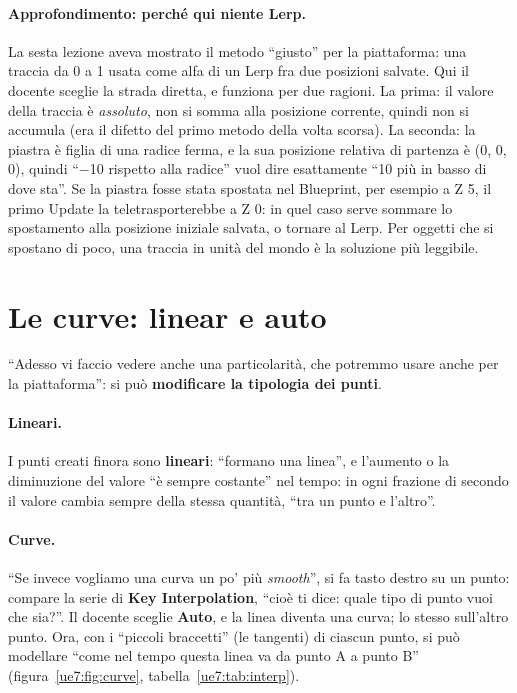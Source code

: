 \paragraph{Approfondimento: perché qui niente Lerp.} La sesta lezione aveva mostrato il
metodo ``giusto'' per la piattaforma: una traccia da 0 a 1 usata come alfa di un Lerp
fra due posizioni salvate. Qui il docente sceglie la strada diretta, e funziona per due
ragioni. La prima: il valore della traccia è \emph{assoluto}, non si somma alla posizione
corrente, quindi non si accumula (era il difetto del primo metodo della volta scorsa).
La seconda: la piastra è figlia di una radice ferma, e la sua posizione relativa di
partenza è (0, 0, 0), quindi ``$-$10 rispetto alla radice'' vuol dire esattamente ``10
più in basso di dove sta''. Se la piastra fosse stata spostata nel Blueprint, per
esempio a Z 5, il primo Update la teletrasporterebbe a Z 0: in quel caso serve sommare
lo spostamento alla posizione iniziale salvata, o tornare al Lerp. Per oggetti che si
spostano di poco, una traccia in unità del mondo è la soluzione più leggibile.

\section{Le curve: linear e auto}
\label{ue7:sec:curve}

``Adesso vi faccio vedere anche una particolarità, che potremmo usare anche per la
piattaforma'': si può \textbf{modificare la tipologia dei punti}.

\paragraph{Lineari.} I punti creati finora sono \textbf{lineari}: ``formano una linea'',
e l'aumento o la diminuzione del valore ``è sempre costante'' nel tempo: in ogni
frazione di secondo il valore cambia sempre della stessa quantità, ``tra un punto e
l'altro''.

\paragraph{Curve.} ``Se invece vogliamo una curva un po' più \emph{smooth}'', si fa tasto
destro su un punto: compare la serie di \textbf{Key Interpolation}, ``cioè ti dice: quale
tipo di punto vuoi che sia?''. Il docente sceglie \textbf{Auto}, e la linea diventa una
curva; lo stesso sull'altro punto. Ora, con i ``piccoli braccetti'' (le tangenti) di
ciascun punto, si può modellare ``come nel tempo questa linea va da punto A a punto B''
(figura~\ref{ue7:fig:curve}, tabella~\ref{ue7:tab:interp}).

